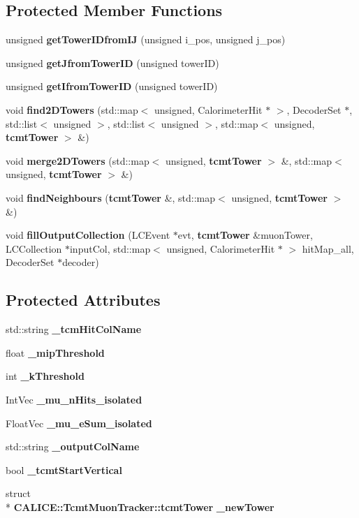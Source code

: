 \subsection*{Protected Member Functions}
\begin{DoxyCompactItemize}
\item 
unsigned {\bf get\-Tower\-I\-Dfrom\-I\-J} (unsigned i\-\_\-pos, unsigned j\-\_\-pos)
\item 
unsigned {\bf get\-Jfrom\-Tower\-I\-D} (unsigned tower\-I\-D)
\item 
unsigned {\bf get\-Ifrom\-Tower\-I\-D} (unsigned tower\-I\-D)
\item 
void {\bf find2\-D\-Towers} (std\-::map$<$ unsigned, Calorimeter\-Hit $\ast$ $>$, Decoder\-Set $\ast$, std\-::list$<$ unsigned $>$, std\-::list$<$ unsigned $>$, std\-::map$<$ unsigned, {\bf tcmt\-Tower} $>$ \&)
\item 
void {\bf merge2\-D\-Towers} (std\-::map$<$ unsigned, {\bf tcmt\-Tower} $>$ \&, std\-::map$<$ unsigned, {\bf tcmt\-Tower} $>$ \&)
\item 
void {\bf find\-Neighbours} ({\bf tcmt\-Tower} \&, std\-::map$<$ unsigned, {\bf tcmt\-Tower} $>$ \&)
\item 
void {\bf fill\-Output\-Collection} (L\-C\-Event $\ast$evt, {\bf tcmt\-Tower} \&muon\-Tower, L\-C\-Collection $\ast$input\-Col, std\-::map$<$ unsigned, Calorimeter\-Hit $\ast$ $>$ hit\-Map\-\_\-all, Decoder\-Set $\ast$decoder)
\end{DoxyCompactItemize}
\subsection*{Protected Attributes}
\begin{DoxyCompactItemize}
\item 
std\-::string {\bf \-\_\-tcm\-Hit\-Col\-Name}
\item 
float {\bf \-\_\-mip\-Threshold}
\item 
int {\bf \-\_\-k\-Threshold}
\item 
Int\-Vec {\bf \-\_\-mu\-\_\-n\-Hits\-\_\-isolated}
\item 
Float\-Vec {\bf \-\_\-mu\-\_\-e\-Sum\-\_\-isolated}
\item 
std\-::string {\bf \-\_\-output\-Col\-Name}
\item 
bool {\bf \-\_\-tcmt\-Start\-Vertical}
\item 
struct \\*
{\bf C\-A\-L\-I\-C\-E\-::\-Tcmt\-Muon\-Tracker\-::tcmt\-Tower} {\bfseries \-\_\-new\-Tower}\label{classCALICE_1_1TcmtMuonTracker_a8189d19eeacdfabf3c5d71c97962f743}

\end{DoxyCompactItemize}
